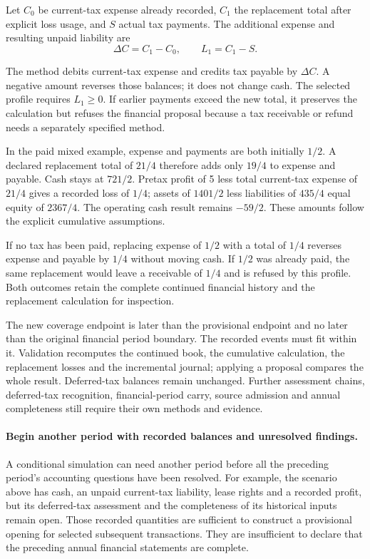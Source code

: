 \begin{samepage}
Let $C_0$ be current-tax expense already recorded, $C_1$ the replacement total
after explicit loss usage, and $S$ actual tax payments. The additional expense
and resulting unpaid liability are
\[
 \Delta C=C_1-C_0,\qquad L_1=C_1-S.
\]
\end{samepage}
The method debits current-tax expense and credits tax payable by $\Delta C$.
A negative amount reverses those balances; it does not change cash. The
selected profile requires $L_1\geq0$. If earlier payments exceed the new total,
it preserves the calculation but refuses the financial proposal because a
tax receivable or refund needs a separately specified method.

In the paid mixed example, expense and payments are both initially $1/2$.
A declared replacement total of $21/4$ therefore adds only $19/4$ to expense
and payable. Cash stays at $721/2$. Pretax profit of 5 less total current-tax
expense of $21/4$ gives a recorded loss of $1/4$; assets of $1401/2$ less
liabilities of $435/4$ equal equity of $2367/4$. The operating cash result
remains $-59/2$. These amounts follow the explicit cumulative assumptions.

If no tax has been paid, replacing expense of $1/2$ with a total of $1/4$
reverses expense and payable by $1/4$ without moving cash. If $1/2$ was already
paid, the same replacement would leave a receivable of $1/4$ and is refused by
this profile. Both outcomes retain the complete continued financial history
and the replacement calculation for inspection.

The new coverage endpoint is later than the provisional endpoint and no later
than the original financial period boundary. The recorded events must fit
within it. Validation recomputes the continued book, the cumulative calculation,
the replacement losses and the incremental journal; applying a proposal compares
the whole result. Deferred-tax balances remain unchanged. Further assessment
chains, deferred-tax recognition, financial-period carry, source admission and
annual completeness still require their own methods and evidence.


\paragraph{Begin another period with recorded balances and unresolved findings.}
A conditional simulation can need another period before all the preceding
period's accounting questions have been resolved. For example, the scenario
above has cash, an unpaid current-tax liability, lease rights and a recorded
profit, but its deferred-tax assessment and the completeness of its historical
inputs remain open. Those recorded quantities are sufficient to construct a
provisional opening for selected subsequent transactions. They are insufficient
to declare that the preceding annual financial statements are complete.

